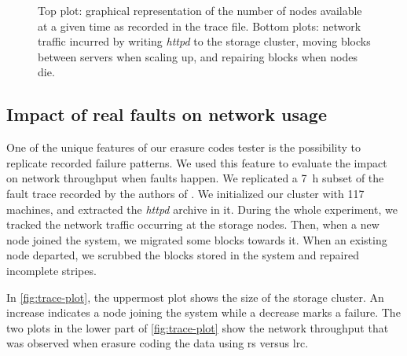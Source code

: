 \begin{figure*}
    \centering
    
    \caption{Top plot: graphical representation of the number of nodes available at a given time as recorded in the trace file. Bottom plots: network traffic incurred by writing \textit{httpd} to the storage cluster, moving blocks between servers when scaling up, and repairing blocks when nodes die.}
    \label{fig:trace-plot}
\end{figure*}

\subsection{Impact of real faults on network usage}
\label{subsec:fault-trace}

One of the unique features of our erasure codes tester is the possibility to replicate recorded failure patterns.
We used this feature to evaluate the impact on network throughput when faults happen.
We replicated a \SI{7}{\hour} subset of the fault trace recorded by the authors of \autocite{websites02}.
We initialized our cluster with 117 machines, and extracted the \textit{httpd} archive in it.
During the whole experiment, we tracked the network traffic occurring at the storage nodes.
Then, when a new node joined the system, we migrated some blocks towards it.
When an existing node departed, we scrubbed the blocks stored in the system and repaired incomplete stripes.

In \autoref{fig:trace-plot}, the uppermost plot shows the size of the storage cluster.
An increase indicates a node joining the system while a decrease marks a failure.
The two plots in the lower part of \autoref{fig:trace-plot} show the network throughput that was observed when erasure coding the data using \ac{rs} versus \ac{lrc}.

